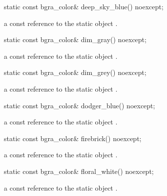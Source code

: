 \begin{itemdecl}
static const bgra_color& deep_sky_blue() noexcept;
\end{itemdecl}
\begin{itemdescr}
\pnum
\returns
a const reference to the static  object .
\end{itemdescr}

\begin{itemdecl}
static const bgra_color& dim_gray() noexcept;
\end{itemdecl}
\begin{itemdescr}
\pnum
\returns
a const reference to the static  object .
\end{itemdescr}

\begin{itemdecl}
static const bgra_color& dim_grey() noexcept;
\end{itemdecl}
\begin{itemdescr}
\pnum
\returns
a const reference to the static  object .
\end{itemdescr}

\begin{itemdecl}
static const bgra_color& dodger_blue() noexcept;
\end{itemdecl}
\begin{itemdescr}
\pnum
\returns
a const reference to the static  object .
\end{itemdescr}

\begin{itemdecl}
static const bgra_color& firebrick() noexcept;
\end{itemdecl}
\begin{itemdescr}
\pnum
\returns
a const reference to the static  object .
\end{itemdescr}

\begin{itemdecl}
static const bgra_color& floral_white() noexcept;
\end{itemdecl}
\begin{itemdescr}
\pnum
\returns
a const reference to the static  object .
\end{itemdescr}

